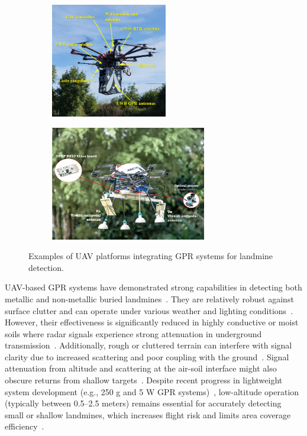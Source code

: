 \begin{figure}[h!]
    \centering
    \begin{subfigure}[b]{0.48\linewidth}
        \centering
        \includegraphics[height=5cm]{figs/Huirui/gpr_drone1.png}
        \label{fig:gpr_drone1}
    \end{subfigure}
    \hfill
    \begin{subfigure}[b]{0.48\linewidth}
        \centering
        \includegraphics[height=5cm]{figs/Huirui/gpr_drone2.png}
        \label{fig:gpr_drone2}
    \end{subfigure}
    \caption{Examples of \gls{UAV} platforms integrating \gls{GPR} systems for landmine detection.~\cite{garcia2022safedrone,cerquera2017uav}}
    \label{fig:gpr_uav_examples}
\end{figure}

\gls{UAV}-based \gls{GPR} systems have demonstrated strong capabilities in detecting both metallic and non-metallic buried landmines~\cite{vsipovs2020lightweight,colorado2017integrated}. They are relatively robust against surface clutter and can operate under various weather and lighting conditions~\cite{noviello2022overview}. However, their effectiveness is significantly reduced in highly conductive or moist soils where radar signals experience strong attenuation in underground transmission~\cite{lee2023modeling}. Additionally, rough or cluttered terrain can interfere with signal clarity due to increased scattering and poor coupling with the ground~\cite{yoo2021application}. Signal attenuation from altitude and scattering at the air-soil interface might also obscure returns from shallow targets~\cite{garcia2019autonomous}. Despite recent progress in lightweight system development (e.g., 250 g and 5 W \gls{GPR} systems)~\cite{colorado2017integrated}, low-altitude operation (typically between 0.5--2.5 meters) remains essential for accurately detecting small or shallow landmines, which increases flight risk and limits area coverage efficiency~\cite{vsipovs2020lightweight,colorado2017integrated,fernandez2021development}.



